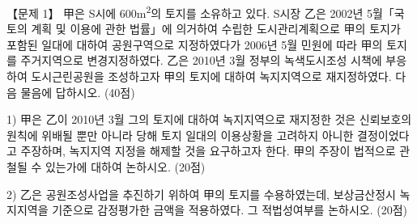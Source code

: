 \begin{longquestion}{【문제 1】}
甲은 S시에 600m\textsuperscript{2}의 토지를 소유하고 있다. S시장 乙은 2002년 5월「국토의 계획 및 이용에 관한 법률」에 의거하여 수립한 도시관리계획으로 甲의 토지가 포함된 일대에 대하여 공원구역으로 지정하였다가 2006년 5월 민원에 따라 甲의 토지를 주거지역으로 변경지정하였다. 乙은 2010년 3월 정부의 녹색도시조성 시책에 부응하여 도시근린공원을 조성하고자 甲의 토지에 대하여 녹지지역으로 재지정하였다. 다음 물음에 답하시오. (40점) \par
1) 甲은 乙이 2010년 3월 그의 토지에 대하여 녹지지역으로 재지정한 것은 신뢰보호의 원칙에 위배될 뿐만 아니라 당해 토지 일대의 이용상황을 고려하지 아니한 결정이었다고 주장하며, 녹지지역 지정을 해제할 것을 요구하고자 한다. 甲의 주장이 법적으로 관철될 수 있는가에 대하여 논하시오. (20점) \par
2) 乙은 공원조성사업을 추진하기 위하여 甲의 토지를 수용하였는데, 보상금산정시 녹지지역을 기준으로 감정평가한 금액을 적용하였다. 그 적법성여부를 논하시오. (20점) \par
\end{longquestion}
